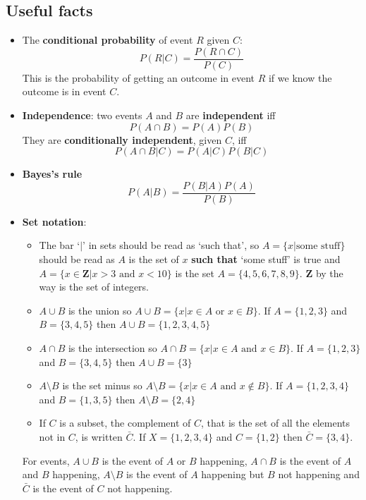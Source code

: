 \documentclass[11pt,a4paper]{scrartcl}
\begin{document}
\subsection*{Useful facts}

\begin{itemize}


\item The \textbf{conditional probability} of event $R$ given $C$:
  \begin{equation}
P(R|C)=\frac{P(R\cap C)}{P(C)} 
  \end{equation}
  This is the probability of getting an outcome in event $R$ if we
  know the outcome is in event $C$.

\item \textbf{Independence}: two events $A$ and $B$ are \textbf{independent} iff
  \begin{equation}
    P(A\cap B)=P(A)P(B)
  \end{equation}
  They are \textbf{conditionally independent}, given $C$, iff
  \begin{equation}
    P(A\cap B|C)=P(A|C)P(B|C)
  \end{equation}

\item \textbf{Bayes's rule}
\begin{equation}
P(A|B)=\frac{P(B|A)P(A)}{P(B)}
\end{equation}

\item \textbf{Set notation}:
  \begin{itemize}
\item The bar `$|$' in sets should be read as `such that', so $A=\{x|\mbox{some stuff}\}$ should be read as $A$ is the set of $x$ \textbf{such that} `some stuff' is true and $A=\{x\in \mathbf{Z}|x>3\mbox{ and }x<10\}$ is the set $A=\{4,5,6,7,8,9\}$. $\mathbf{Z}$ by the way is the set of integers.
  \item $A\cup B$ is the union so $A\cup B=\{x|x\in A\mbox{ or }x\in B\}$. If $A=\{1,2,3\}$ and $B=\{3,4,5\}$ then $A\cup B=\{1,2,3,4,5\}$
  \item $A\cap B$ is the intersection so $A\cap B=\{x|x\in A\mbox{ and }x\in B\}$. If $A=\{1,2,3\}$ and $B=\{3,4,5\}$ then $A\cup B=\{3\}$
   \item $A\setminus B$ is the set minus so $A\setminus B=\{x|x\in A\mbox{ and }x\not\in B\}$. If $A=\{1,2,3,4\}$ and $B=\{1,3,5\}$ then $A\setminus B=\{2,4\}$
   \item If $C$ is a subset, the complement of $C$, that is the set of all the elements not in $C$, is written $\bar{C}$. If $X=\{1,2,3,4\}$ and $C=\{1,2\}$ then $\bar{C}=\{3,4\}$.
  \end{itemize}
  For events, $A\cup B$ is the event of $A$ or $B$ happening, $A\cap
  B$ is the event of $A$ and $B$ happening, $A\setminus B$ is the
  event of $A$ happening but $B$ not happening and $\bar{C}$ is the
  event of $C$ not happening.

  \end{itemize}
\end{document}
